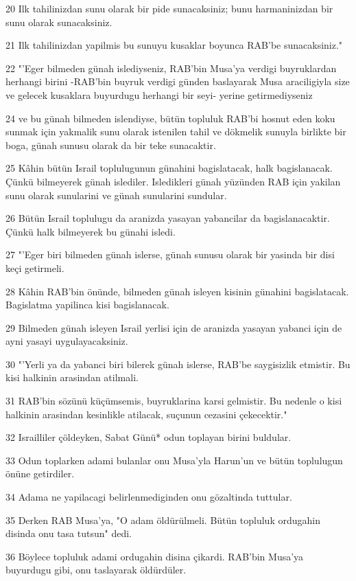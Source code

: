 \par 20 Ilk tahilinizdan sunu olarak bir pide sunacaksiniz; bunu harmaninizdan bir sunu olarak sunacaksiniz.
\par 21 Ilk tahilinizdan yapilmis bu sunuyu kusaklar boyunca RAB'be sunacaksiniz."
\par 22 "'Eger bilmeden günah islediyseniz, RAB'bin Musa'ya verdigi buyruklardan herhangi birini -RAB'bin buyruk verdigi günden baslayarak Musa araciligiyla size ve gelecek kusaklara buyurdugu herhangi bir seyi- yerine getirmediyseniz
\par 24 ve bu günah bilmeden islendiyse, bütün topluluk RAB'bi hosnut eden koku sunmak için yakmalik sunu olarak istenilen tahil ve dökmelik sunuyla birlikte bir boga, günah sunusu olarak da bir teke sunacaktir.
\par 25 Kâhin bütün Israil toplulugunun günahini bagislatacak, halk bagislanacak. Çünkü bilmeyerek günah islediler. Isledikleri günah yüzünden RAB için yakilan sunu olarak sunularini ve günah sunularini sundular.
\par 26 Bütün Israil toplulugu da aranizda yasayan yabancilar da bagislanacaktir. Çünkü halk bilmeyerek bu günahi isledi.
\par 27 "'Eger biri bilmeden günah islerse, günah sunusu olarak bir yasinda bir disi keçi getirmeli.
\par 28 Kâhin RAB'bin önünde, bilmeden günah isleyen kisinin günahini bagislatacak. Bagislatma yapilinca kisi bagislanacak.
\par 29 Bilmeden günah isleyen Israil yerlisi için de aranizda yasayan yabanci için de ayni yasayi uygulayacaksiniz.
\par 30 "'Yerli ya da yabanci biri bilerek günah islerse, RAB'be saygisizlik etmistir. Bu kisi halkinin arasindan atilmali.
\par 31 RAB'bin sözünü küçümsemis, buyruklarina karsi gelmistir. Bu nedenle o kisi halkinin arasindan kesinlikle atilacak, suçunun cezasini çekecektir."
\par 32 Israilliler çöldeyken, Sabat Günü* odun toplayan birini buldular.
\par 33 Odun toplarken adami bulanlar onu Musa'yla Harun'un ve bütün toplulugun önüne getirdiler.
\par 34 Adama ne yapilacagi belirlenmediginden onu gözaltinda tuttular.
\par 35 Derken RAB Musa'ya, "O adam öldürülmeli. Bütün topluluk ordugahin disinda onu tasa tutsun" dedi.
\par 36 Böylece topluluk adami ordugahin disina çikardi. RAB'bin Musa'ya buyurdugu gibi, onu taslayarak öldürdüler.
